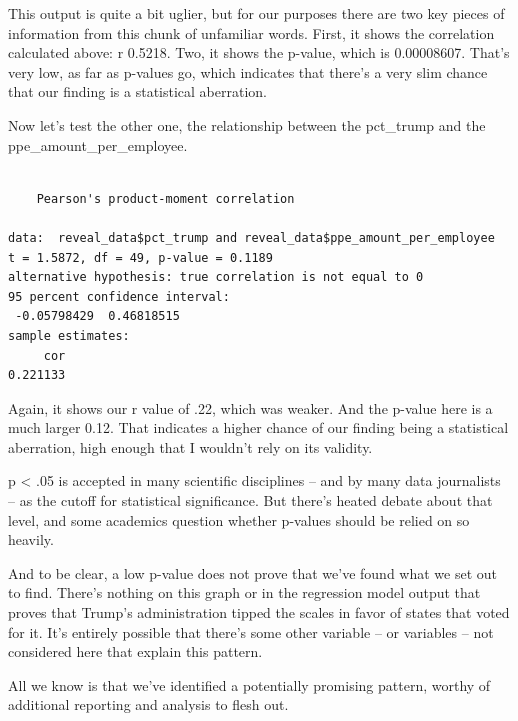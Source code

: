 \documentclass[
  letterpaper,
  DIV=11,
  numbers=noendperiod]{scrreprt}
\newenvironment{Shaded}{\begin{snugshade}}{\end{snugshade}}
\newcommand{\FunctionTok}[1]{\textcolor[rgb]{0.28,0.35,0.67}{#1}}
\newcommand{\NormalTok}[1]{\textcolor[rgb]{0.00,0.23,0.31}{#1}}
\newcommand{\SpecialCharTok}[1]{\textcolor[rgb]{0.37,0.37,0.37}{#1}}
\begin{document}
This output is quite a bit uglier, but for our purposes there are two
key pieces of information from this chunk of unfamiliar words. First, it
shows the correlation calculated above: r 0.5218. Two, it shows the
p-value, which is 0.00008607. That's very low, as far as p-values go,
which indicates that there's a very slim chance that our finding is a
statistical aberration.

Now let's test the other one, the relationship between the pct\_trump
and the ppe\_amount\_per\_employee.

\begin{Shaded}
\end{Shaded}

\begin{verbatim}

    Pearson's product-moment correlation

data:  reveal_data$pct_trump and reveal_data$ppe_amount_per_employee
t = 1.5872, df = 49, p-value = 0.1189
alternative hypothesis: true correlation is not equal to 0
95 percent confidence interval:
 -0.05798429  0.46818515
sample estimates:
     cor 
0.221133 
\end{verbatim}

Again, it shows our r value of .22, which was weaker. And the p-value
here is a much larger 0.12. That indicates a higher chance of our
finding being a statistical aberration, high enough that I wouldn't rely
on its validity.

p \textless{} .05 is accepted in many scientific disciplines -- and by
many data journalists -- as the cutoff for statistical significance. But
there's heated debate about that level, and some academics question
whether p-values should be relied on so heavily.

And to be clear, a low p-value does not prove that we've found what we
set out to find. There's nothing on this graph or in the regression
model output that proves that Trump's administration tipped the scales
in favor of states that voted for it. It's entirely possible that
there's some other variable -- or variables -- not considered here that
explain this pattern.

All we know is that we've identified a potentially promising pattern,
worthy of additional reporting and analysis to flesh out.
\end{document}
